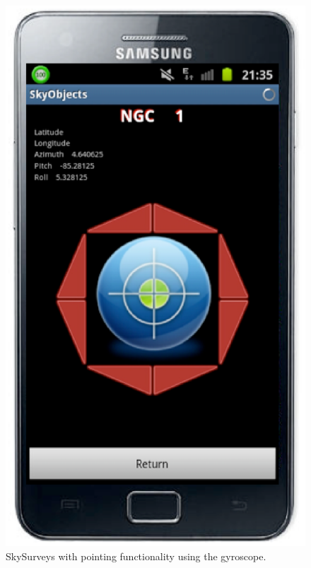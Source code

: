 \begin{figure}[h]
\includegraphics[scale=0.28]{part5/Schaaff_O28/O28_f6.eps}
\caption{SkySurveys with pointing functionality using the gyroscope.} 
\label{O28:3}
\end{figure}

